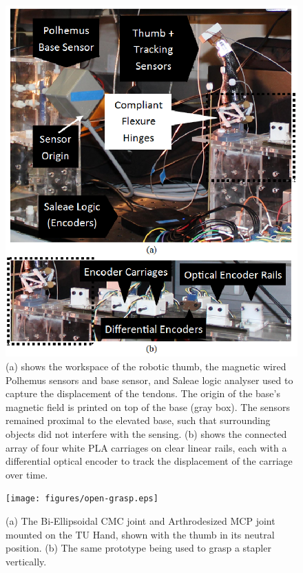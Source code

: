 \documentclass[journal]{IEEEtran}
\begin{document}
\begin{figure}
	\centering
	\includegraphics[width = 1\columnwidth]{figures/polhemus_and_setup.eps}
	\caption{(a) shows the workspace of the robotic thumb, the magnetic wired Polhemus sensors and base sensor, and Saleae logic analyser used to capture the displacement of the tendons. The origin of the base's magnetic field is printed on top of the base (gray box). The sensors remained proximal to the elevated base, such that surrounding objects did not interfere with the sensing. (b) shows the connected array of four white PLA carriages on clear linear rails, each with a differential optical encoder to track the displacement of the carriage over time.}
 \label{experiment}
\end{figure}

\begin{figure}
	\centering
	\texttt{[image: figures/open-grasp.eps]}\\
	\caption{(a) The Bi-Ellipsoidal CMC joint and Arthrodesized MCP joint mounted on the TU Hand, shown with the thumb in its neutral position. (b) The same prototype being used to grasp a stapler vertically.}\label{handgrasp}

\end{figure}
\end{document}
